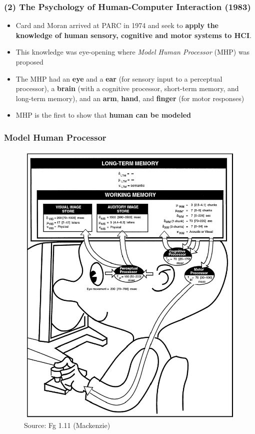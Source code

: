 \documentclass{beamer}
\begin{document}

\begin{frame}
\frametitle{(2) The Psychology of Human-Computer Interaction (1983)}
\begin{itemize}
	\item Card and Moran arrived at PARC in 1974 and seek to \textbf{apply the knowledge of human sensory, cognitive and motor systems to HCI}. 
	\item This knowledge was eye-opening where  \textit{Model Human Processor} (MHP) was proposed
	\item The MHP had an \textbf{eye} and a \textbf{ear} (for sensory input to a perceptual processor), a \textbf{brain} (with a cognitive processor, short-term memory, and long-term memory), and an \textbf{arm}, \textbf{hand}, and \textbf{finger} (for motor responses) 
	\item MHP is the first to show that \textbf{human can be modeled}
\end{itemize}
\end{frame}

\begin{frame}
\frametitle{Model Human Processor}
\begin{figure}
	\includegraphics[width=0.4\linewidth]{mhp}
	\caption{Source: Fg 1.11 (Mackenzie)}
\end{figure}
\end{frame}
\end{document}

